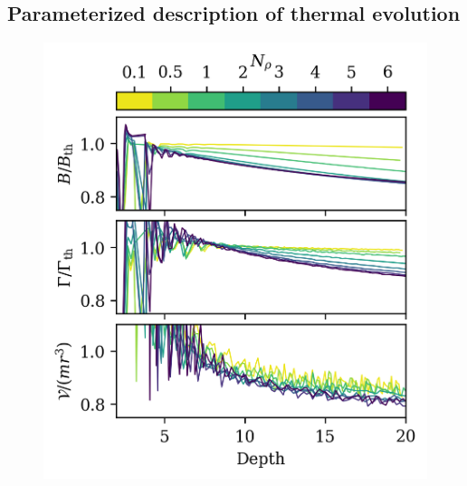 \documentclass[twocolumn, amsmath, amsfonts, amssymb, trackchanges]{aastex62}
\begin{document}
\subsection{Parameterized description of thermal evolution}
\begin{figure}[t!]
    \includegraphics[width=\columnwidth]{constants.png}
    \caption{
    \label{fig:constants} }
\end{figure}
\end{document}

